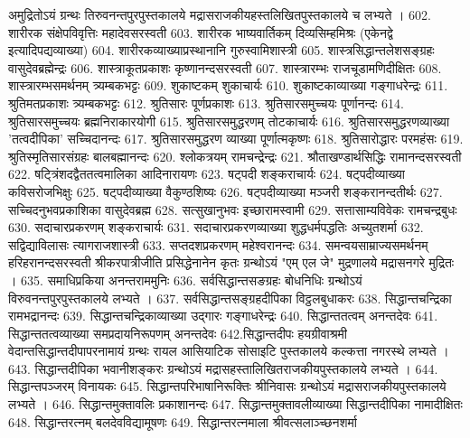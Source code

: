 		अमुद्रितोऽयं ग्रन्थः तिरुवनन्तपुरपुस्तकालये मद्रासराजकीयहस्तलिखितपुस्तकालये च लभ्यते । 
602. शारीरक संक्षेपविवृत्तिः				महादेवसरस्वती 
603. शारीरक भाष्यवार्तिकम् 				दिव्यसिम्हमिश्रः
		(एकेनद्वे इत्यादिपद्यव्याख्या)
604. शारीरकव्याख्याप्रस्थानानि			गुरुस्वामिशास्त्री
605. शास्त्रसिद्धान्तलेशसङ्ग्रहः				वासुदेवब्रह्मेन्द्रः
606. शास्त्राकूतप्रकाशः						कृष्णानन्दसरस्वती
607. शास्त्रारम्भः							राजचूडामणिदीक्षितः 
608. शास्त्रारम्भसमर्थनम् 					त्र्यम्बकभट्टः
609. शुकाष्टकम् 							शुकाचार्यः
610. शुकाष्टकाव्याख्या						गङ्गाधरेन्द्रः
611. श्रुतिमतप्रकाशः							त्र्यम्बकभट्टः 
612. श्रुतिसारः								पूर्णप्रकाशः
613. श्रुतिसारसमुच्चयः						पूर्णानन्दः
614. श्रुतिसारसमुच्चयः						ब्रह्मनिराकारयोगी
615. श्रुतिसारसमुद्धरणम् 					तोटकाचार्यः
616. श्रुतिसारसमुद्धरणव्याख्या 'तत्वदीपिका' सच्चिदानन्दः
617. श्रुतिसारसमुद्धरण व्याख्या				पूर्णात्मकृष्णः
618. श्रुतिसारोद्धारः							परमहंसः
619. श्रुतिस्मृतिसारसंग्रहः					बालबह्मानन्दः
620. श्लोकत्रयम्							रामचन्द्रेन्द्रः
621. श्रौताखण्डार्थसिद्धिः					रामानन्दसरस्वती 
622. षट्त्रिंशदद्वैततत्वमालिका				आदिनारायणः
623. षट्पदी									शङ्कराचार्यः
624. षट्पदीव्याख्या 						कविसरोजभिक्षुः
625. षट्पदीव्याख्या 						वैकुण्ठशिष्यः 
626. षट्पदीव्याख्या मञ्जरी					शङ्करानन्दतीर्थः
627. सच्चिदनुभवप्रकाशिका				वासुदेवब्रह्म
628. सत्सुखानुभवः							इच्छारामस्वामी 
629. सत्तासाम्यविवेकः						रामचन्द्रबुधः 
630. सदाचारप्रकरणम् 						शङ्कराचार्यः
631. सदाचारप्रकरणव्याख्या शुद्धधर्मपद्धतिः अच्युतशर्मा
632. सद्विद्याविलासः						त्यागराजशास्त्री
633. सप्तदशप्रकरणम् 						महेश्वरानन्दः
634. समन्वयसाम्राज्यसमर्थनम् 			हरिहरानन्दसरस्वती
		श्रीकरपात्रीजीति प्रसिद्धेनानेन कृतः ग्रन्थोऽयं "एम् एल जे" मुद्रणालये मद्रासनगरे मुद्रितः । 
635. समाधिप्रकिया 						अनन्तराममुनिः
636. सर्वसिद्धान्तसङग्रहः					बोधनिधिः
		ग्रन्थोऽयं विरुवनन्तपुरपुस्तकालये लभ्यते ।
637. सर्वसिद्धान्तसङ्ग्रहदीपिका			विट्ठलबुधाकरः 
638. सिद्धान्तचन्द्रिका						रामभद्रानन्दः
639. सिद्धान्तचन्द्रिकाव्याख्या उद्गारः		गङ्गाधरेन्द्रः 
640. सिद्धान्ततत्वम् 						अनन्तदेवः
641. सिद्धान्ततत्वव्याख्या समप्रदायनिरूपणम् अनन्तदेवः
642.सिद्धान्तदीपः							हयग्रीवाश्रमी
		वेदान्तसिद्धान्तदीपापरनामायं ग्रन्थः रायल आसियाटिक सोसाइटि पुस्तकालये कल्कत्ता नगरस्थे लभ्यते । 
643. सिद्धान्तदीपिका 						भवानीशङ्करः
		ग्रन्थोऽयं मद्रासहस्तालिखितराजकीयपुस्तकालये लभ्यते । 
644. सिद्धान्तपञ्जरम् 						विनायकः 
645. सिद्धान्तपरिभाषानिरूक्तिः				श्रीनिवासः
		ग्रन्थोऽयं मद्रासराजकीयपुस्तकालये लभ्यते । 
646. सिद्धान्तमुक्तावलिः					प्रकाशानन्दः
647. सिद्धान्तमुक्तावलीव्याख्या सिद्धान्तदीपिका नामादीक्षितः
648. सिद्धान्तरत्नम् 						बलदेवविद्यामूषणः 
649. सिद्धान्तरत्नमाला 					श्रीवत्सलाञ्च्छनशर्मा 

